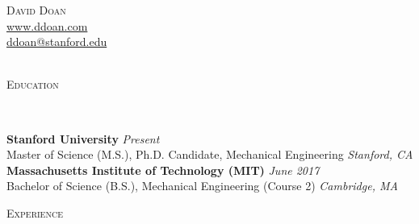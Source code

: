 \documentclass[9pt]{article}
\newenvironment{changemargin}[2]{%
  \begin{list}{}{%
    \setlength{\topsep}{0pt}%
    \setlength{\leftmargin}{#1}%
    \setlength{\rightmargin}{#2}%
    \setlength{\listparindent}{\parindent}%
    \setlength{\itemindent}{\parindent}%
    \setlength{\parsep}{\parskip}%
  }%
  \item[]}{\end{list}
}
\newcommand{\lineover}{
	\begin{changemargin}{-0.05in}{-0.05in}
		\vspace*{-8pt}
		\hrulefill \\
		\vspace*{-2pt}
	\end{changemargin}
}
\newcommand{\header}[1]{
	\begin{changemargin}{-0.5in}{-0.5in}
		\scshape{#1}\\
  	\lineover
	\end{changemargin}
}
\newcommand{\contact}[4]{
	\begin{changemargin}{-0.5in}{-0.5in}
		\begin{center}
			{\Large \scshape {#1}}\\ \smallskip
      {\url{#2}}\\ \smallskip
			{\url{#3}}\\ \smallskip
			{\url{#4}}\\
		\end{center}
	\end{changemargin}
}
\newenvironment{body} {
	\vspace*{-16pt}
	\begin{changemargin}{-0.25in}{-0.5in}
  }	
	{\end{changemargin}
}
\begin{document}
\contact{David Doan}{www.ddoan.com}{ddoan@stanford.edu}{}

\header{Education}

\begin{body}
	\vspace{14pt}
	\textbf{Stanford University}{} \hfill \emph{Present}{} \\
	Master of Science (M.S.), Ph.D. Candidate, Mechanical Engineering \hfill \emph{Stanford, CA}{} \\
	\medskip
	\textbf{Massachusetts Institute of Technology (MIT)}{} \hfill \emph{June 2017}{} \\
	Bachelor of Science (B.S.), Mechanical Engineering (Course 2) \hfill \emph{Cambridge, MA}{}
\end{body}
\medskip

\header{Experience}
\end{document}
